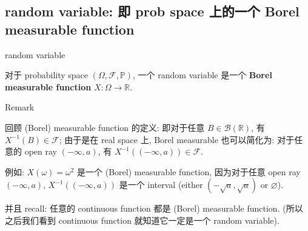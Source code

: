 \documentclass{qlnotes-export}
\begin{document}
\subsection{random variable: 即 prob space 上的一个 Borel measurable function}\label{random-variable-ux5373-prob-space-ux4e0aux7684ux4e00ux4e2a-borel-measurable-function}

\begin{definition}{random variable}\label{def-02-random-variables-random-variable}

对于 probability space \((\Omega,\mathcal{F},{\mathbb{P}})\), 一个 random variable 是一个 \textbf{Borel measurable function} \(X:\Omega\rightarrow{\mathbb{R}}\).

\end{definition}

\begin{qlremark}{Remark}

回顾 (Borel) measurable function 的定义: 即对于任意 \(B \in \mathcal{B}({\mathbb{R}})\), 有 \(X^{- 1}(B) \in \mathcal{F}\); 由于是在 real space 上, Borel measurable 也可以简化为: 对于任意的 open ray \(( - \infty,a)\), 有 \(X^{- 1}(( - \infty,a)) \in \mathcal{F}\).

例如: \(X(\omega) = \omega^{2}\) 是一个 (Borel) measurable function, 因为对于任意 open ray \(( - \infty,a)\), \(X^{- 1}(( - \infty,a))\) 是一个 interval (either \(( - \sqrt{a},\sqrt{a})\) or \(\varnothing\)).

并且 recall: 任意的 continuous function 都是 (Borel) measurable function. (所以之后我们看到 continuous function 就知道它一定是一个 random variable).

\end{qlremark}
\end{document}
